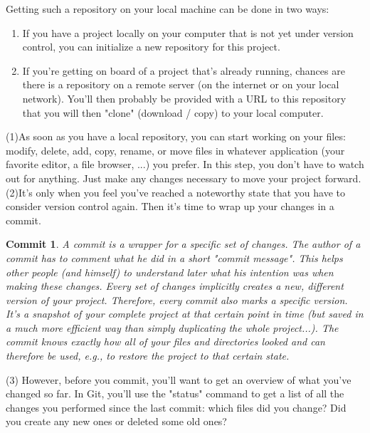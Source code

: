 \documentclass{article}
\begin{document}
Getting such a repository on your local machine can be done in two ways:

\begin{enumerate}
    \item If you have a project locally on your computer that is not yet under version control, you can initialize a new repository for this project.
    \item  If you're getting on board of a project that's already running, chances are there is a repository on a remote server (on the internet or on your local network). You'll then probably be provided with a URL to this repository that you will then "clone" (download / copy) to your local computer.
\end{enumerate}


(1)As soon as you have a local repository, you can start working on your files: modify, delete, add, copy, rename, or move files in whatever application (your favorite editor, a file browser, ...) you prefer. In this step, you don't have to watch out for anything. Just make any changes necessary to move your project forward.
\newline\newline
(2)It's only when you feel you've reached a noteworthy state that you have to consider version control again. Then it's time to wrap up your changes in a commit.
\newtheorem*{commit}{Commit}
\begin{commit}
A commit is a wrapper for a specific set of changes. The author of a commit has to comment what he did in a short "commit message". This helps other people (and himself) to understand later what his intention was when making these changes.
\newline\newline
Every set of changes implicitly creates a new, different version of your project. Therefore, every commit also marks a specific version. It's a snapshot of your complete project at that certain point in time (but saved in a much more efficient way than simply duplicating the whole project...). The commit knows exactly how all of your files and directories looked and can therefore be used, e.g., to restore the project to that certain state.
\end{commit}
(3) However, before you commit, you'll want to get an overview of what you've changed so far. In Git, you'll use the "status" command to get a list of all the changes you performed since the last commit: which files did you change? Did you create any new ones or deleted some old ones?
\end{document}
